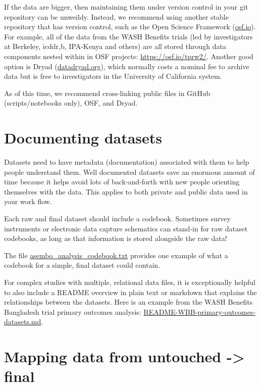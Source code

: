 \documentclass[
]{book}
\begin{document}
If the data are bigger, then maintaining them under version control in your git repository can be unweildy. Instead, we recommend using another stable repository that has version control, such as the Open Science Framework (\href{https://osf.io}{osf.io}). For example, all of the data from the WASH Benefits trials (led by investigators at Berkeley, icddr,b, IPA-Kenya and others) are all stored through data components nested within in OSF projects: \url{https://osf.io/tprw2/}. Another good option is Dryad (\href{https://datadryad.org/}{datadryad.org}), which normally costs a nominal fee to archive data but is free to investigators in the University of California system.

As of this time, we recommend cross-linking public files in GitHub (scripts/notebooks only), OSF, and Dryad.

\hypertarget{documenting-datasets}{%
\section{Documenting datasets}\label{documenting-datasets}}

Datasets need to have metadata (documentation) associated with them to help people understand them. Well documented datasets save an enormous amount of time because it helps avoid lots of back-and-forth with new people orienting themselves with the data. This applies to both private and public data used in your work flow.

Each raw and final dataset should include a codebook. Sometimes survey instruments or electronic data capture schematics can stand-in for raw dataset codebooks, as long as that information is stored alongside the raw data!

The file \href{https://github.com/ben-arnold/enterics-seroepi/blob/master/data/asembo_analysis_codebook.txt}{asembo\_analysis\_codebook.txt} provides one example of what a codebook for a simple, final dataset could contain.

For complex studies with multiple, relational data files, it is exceptionally helpful to also include a README overview in plain text or markdown that explains the relationships between the datasets. Here is an example from the WASH Benefits Bangladesh trial primary outcomes analysis: \href{https://osf.io/v3nfs/}{README-WBB-primary-outcomes-datasets.md}.

\hypertarget{mapping-data-from-untouched---final}{%
\section{Mapping data from untouched -\textgreater{} final}\label{mapping-data-from-untouched---final}}
\end{document}
